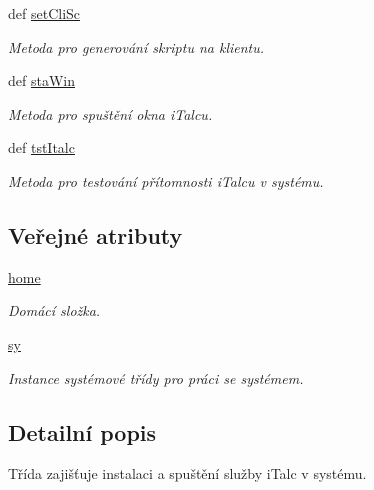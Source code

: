 \begin{DoxyCompactItemize}
def \hyperlink{classiTaHand_1_1iTaHand_af0efe4524aaf862e6edc470c970bdfec}{set\-Cli\-Sc}
\begin{DoxyCompactList}\small\item\em Metoda pro generování skriptu na klientu. \end{DoxyCompactList}\item 
def \hyperlink{classiTaHand_1_1iTaHand_a457b5b5eea69bc89feedccd9d9c284ea}{sta\-Win}
\begin{DoxyCompactList}\small\item\em Metoda pro spuštění okna i\-Talcu. \end{DoxyCompactList}\item 
def \hyperlink{classiTaHand_1_1iTaHand_a8d32bbd5a4612858700fd3ec4f7a42bc}{tst\-Italc}
\begin{DoxyCompactList}\small\item\em Metoda pro testování přítomnosti i\-Talcu v systému. \end{DoxyCompactList}\end{DoxyCompactItemize}
\subsection*{Veřejné atributy}
\begin{DoxyCompactItemize}
\item 
\hypertarget{classiTaHand_1_1iTaHand_aa44b708f50ec7c449ac0ff43573573d8}{\hyperlink{classiTaHand_1_1iTaHand_aa44b708f50ec7c449ac0ff43573573d8}{home}}\label{dc/de8/classiTaHand_1_1iTaHand_aa44b708f50ec7c449ac0ff43573573d8}

\begin{DoxyCompactList}\small\item\em Domácí složka. \end{DoxyCompactList}\item 
\hypertarget{classiTaHand_1_1iTaHand_a926ddaf1090328b21386ed76edc484c5}{\hyperlink{classiTaHand_1_1iTaHand_a926ddaf1090328b21386ed76edc484c5}{sy}}\label{dc/de8/classiTaHand_1_1iTaHand_a926ddaf1090328b21386ed76edc484c5}

\begin{DoxyCompactList}\small\item\em Instance systémové třídy pro práci se systémem. \end{DoxyCompactList}\end{DoxyCompactItemize}


\subsection{Detailní popis}
Třída zajišťuje instalaci a spuštění služby i\-Talc v systému. 


